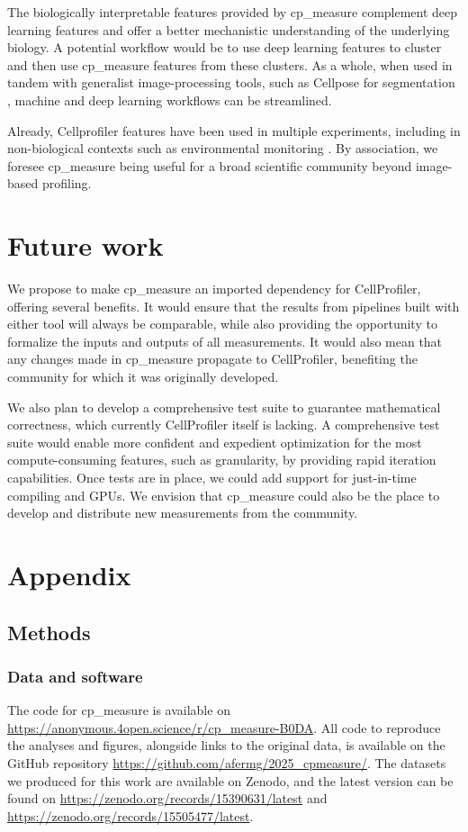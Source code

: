 \documentclass{article}
\begin{document}
The biologically interpretable features provided by cp\_measure complement deep learning features and offer a better mechanistic understanding of the underlying biology. A potential workflow would be to use deep learning features to cluster and then use cp\_measure features from these clusters. As a whole, when used in tandem with generalist image-processing tools, such as Cellpose for segmentation \cite{stringerCellposeGeneralistAlgorithm2021}, machine and deep learning workflows can be streamlined. 

Already, Cellprofiler features have been used in multiple experiments, including in non-biological contexts such as environmental monitoring \citep{ideharaExploringNileRed2025}. By association, we foresee cp\_measure being useful for a broad scientific community beyond image-based profiling.
\section{Future work}
\label{sec:org5cdbb12}
We propose to make cp\_measure an imported dependency for CellProfiler, offering several benefits. It would ensure that the results from pipelines built with either tool will always be comparable, while also providing the opportunity to formalize the inputs and outputs of all measurements. It would also mean that any changes made in cp\_measure propagate to CellProfiler, benefiting the community for which it was originally developed.

We also plan to develop a comprehensive test suite to guarantee mathematical correctness, which currently CellProfiler itself is lacking. A comprehensive test suite would enable more confident and expedient optimization for the most compute-consuming features, such as granularity, by providing rapid iteration capabilities. Once tests are in place, we could add support for just-in-time compiling and GPUs. We envision that cp\_measure could also be the place to develop and distribute new measurements from the community. 



\section{Appendix}
\label{sec:orgdd18dd8}
\subsection{Methods}
\label{sec:orgb3e9382}
\subsubsection{Data and software}
\label{sec:orgbda0ae2}
The code for cp\_measure is available on \url{https://anonymous.4open.science/r/cp\_measure-B0DA}. All code to reproduce the analyses and figures, alongside links to the original data, is available on the GitHub repository \url{https://github.com/afermg/2025\_cpmeasure/}. The datasets we produced for this work are available on Zenodo, and the latest version can be found on \url{https://zenodo.org/records/15390631/latest} and \url{https://zenodo.org/records/15505477/latest}.
\end{document}
